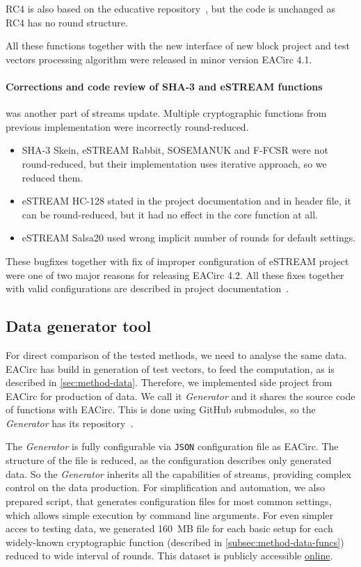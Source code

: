 \documentclass[
  print, %
  Table,   %
  nolof,     %
  nolot,     %
  11pt, %
  oneside  %
]{fithesis3}
\begin{document}
RC4 is also based on the educative repository~\cite{cryptoFunc}, but the code is unchanged as RC4 has no round structure.

All these functions together with the new interface of new block project and test vectors processing algorithm were released in minor version EACirc 4.1.

\paragraph{Corrections and code review of SHA-3 and eSTREAM functions} was another part of streams update. Multiple cryptographic functions from previous implementation were incorrectly round-reduced.
\label{par:method-data-funcs-bugs}

\begin{itemize}
    \item SHA-3 Skein, eSTREAM Rabbit, SOSEMANUK and F-FCSR were not round-reduced, but their implementation uses iterative approach, so we reduced them.
    \item eSTREAM HC-128 stated in the project documentation and in header file, it can be round-reduced, but it had no effect in the core function at all.
    \item eSTREAM Salsa20 used wrong implicit number of rounds for default settings.
\end{itemize}

These bugfixes together with fix of improper configuration of eSTREAM project were one of two major reasons for releasing EACirc 4.2. All these fixes together with valid configurations are described in project documentation~\cite{EACirc-wiki-streams}.

\subsection{Data generator tool}
\label{subsec:method-data-generator}

For direct comparison of the tested methods, we need to analyse the same data. EACirc has build in generation of test vectors, to feed the computation, as is described in \cref{sec:method-data}. Therefore, we implemented side project from EACirc for production of data. We call it \textit{Generator} and it shares the source code of functions with EACirc. This is done using GitHub submodules, so the \textit{Generator} has its repository~\cite{EACircStreams}.

The \textit{Generator} is fully configurable via \texttt{JSON} configuration file as EACirc. The structure of the file is reduced, as the configuration describes only generated data. So the \textit{Generator} inherits all the capabilities of streams, providing complex control on the data production. For simplification and automation, we also prepared script, that generates configuration files for most common settings, which allows simple execution by command line arguments. For even simpler acces to testing data, we generated 160~MB file for each basic setup for each widely-known cryptographic function (described in \cref{subsec:method-data-funcs}) reduced to wide interval of rounds. This dataset is publicly accessible \href{https://drive.google.com/drive/folders/0B5Z1zst5NzwXQmFKaXgxREJWNk0?usp=sharing}{online}.
\end{document}
